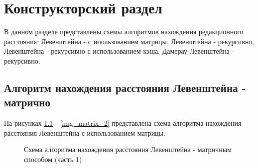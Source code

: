 \chapter{Конструкторский раздел}
В данном разделе представлены схемы алгоритмов нахождения редакционного расстояния: Левенштейна - с ипользованием матрицы, Левенштейна - рекурсивно, Левенштейна - рекурсивно с использованием кэша, Дамерау-Левенштейна - рекурсивно.

\section{Алгоритм нахождения расстояния Левенштейна - матрично}
На рисунках \ref{img_matrix_1} - \ref{img_matrix_2} представлена схема алгоритма нахождения расстояния Левенштейна с использованием матрицы.
\begin{figure}[p]
	\caption{Схема алгоритма нахождения расстояния Левенштейна - матричным способом (часть 1)}
	\label{img_matrix_1}
\end{figure}

